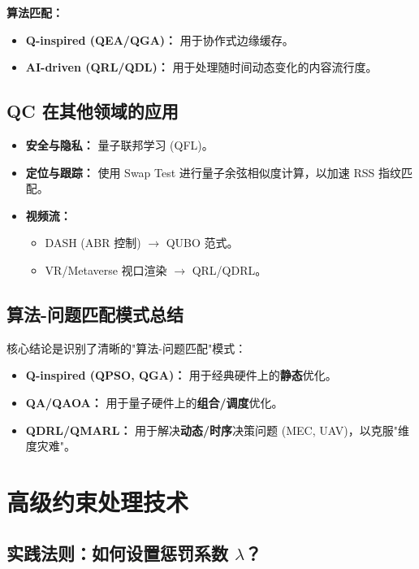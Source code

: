 \documentclass[11pt,a4paper]{article}
\begin{document}
\textbf{算法匹配：}
\begin{itemize}
\item \textbf{Q-inspired (QEA/QGA)：} 用于协作式边缘缓存。
\item \textbf{AI-driven (QRL/QDL)：} 用于处理随时间动态变化的内容流行度。
\end{itemize}

\subsection{QC 在其他领域的应用}

\begin{itemize}
\item \textbf{安全与隐私：} 量子联邦学习 (QFL)。
\item \textbf{定位与跟踪：} 使用 Swap Test 进行量子余弦相似度计算，以加速 RSS 指纹匹配。
\item \textbf{视频流：}
\begin{itemize}
\item DASH (ABR 控制) $\rightarrow$ QUBO 范式。
\item VR/Metaverse 视口渲染 $\rightarrow$ QRL/QDRL。
\end{itemize}
\end{itemize}

\subsection{算法-问题匹配模式总结}

核心结论是识别了清晰的"算法-问题匹配"模式：

\begin{itemize}
\item \textbf{Q-inspired (QPSO, QGA)：} 用于经典硬件上的\textbf{静态}优化。
\item \textbf{QA/QAOA：} 用于量子硬件上的\textbf{组合/调度}优化。
\item \textbf{QDRL/QMARL：} 用于解决\textbf{动态/时序}决策问题 (MEC, UAV)，以克服"维度灾难"。
\end{itemize}

\section{高级约束处理技术}

\subsection{实践法则：如何设置惩罚系数 \texorpdfstring{$\lambda$}{lambda}？}
\end{document}
